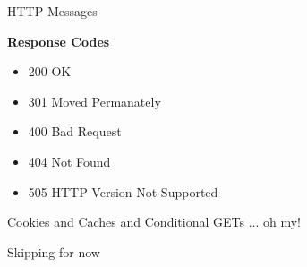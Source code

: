 \begin{topic}{HTTP Messages}
\begin{subtopic}{5}
\textbf{Response Codes}

\begin{itemize}
	\item 200 OK
	\item 301 Moved Permanately
	\item 400 Bad Request
	\item 404 Not Found
	\item 505 HTTP Version Not Supported
\end{itemize}

\end{subtopic}

\end{topic}

\begin{topic}{Cookies and Caches and Conditional GETs}
... oh my!

Skipping for now
\end{topic}